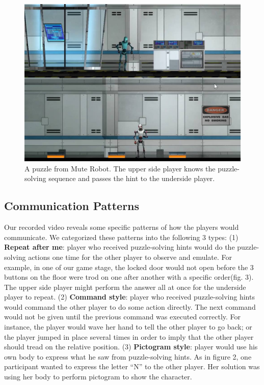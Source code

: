 \documentclass{chi-ext}
\begin{document}
\begin{figure}
  \centering
  \includegraphics[width=0.8\linewidth]{figures/Figure2.jpg}
  \caption{A puzzle from Mute Robot. The upper side player knows the puzzle-solving sequence and passes the hint to the underside player.}
  \label{fig:Figure2}
\end{figure}

\subsection{Communication Patterns}

 Our recorded video reveals some specific patterns of how the players would communicate. We categorized these patterns into the following 3 types:
(1) {\bf Repeat after me}: player who received puzzle-solving hints would do the puzzle-solving actions one time for the other player to observe and emulate. For example, in one of our game stage, the locked door would not open before the 3 buttons on the floor were trod on one after another with a specific order(fig. 3). The upper side player might perform the answer all at once for the underside player to repeat.
(2) {\bf Command style}: player who received puzzle-solving hints would command the other player to do some action directly. The next command would not be given until the previous command was executed correctly. For instance, the player would wave her hand to tell the other player to go back; or the player jumped in place several times in order to imply that the other player should tread on the relative position.
(3) {\bf Pictogram style}: player would use his own body to express what he saw from puzzle-solving hints. As in figure 2, one participant wanted to express the letter ``N'' to the other player. Her solution was using her body to perform pictogram to show the character.
\end{document}
